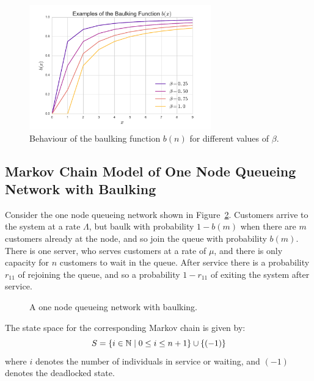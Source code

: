\documentclass{article}
\begin{document}
\begin{figure}[!hbtp]
    \begin{center}
        \includegraphics[width=0.7\textwidth]{img/examplebaulking.pdf}
    \end{center}
    \caption{Behaviour of the baulking function $b(n)$ for different values of $\beta$.}
    \label{fig:examplebaulkingfunctions}
\end{figure}


\subsection{Markov Chain Model of One Node Queueing Network with Baulking}

Consider the one node queueing network shown in Figure~\ref{fig:onenodenetwork_baulking}.
Customers arrive to the system at a rate $\Lambda$, but baulk with probability $1 - b(m)$ when there are $m$ customers already at the node, and so join the queue with probability $b(m)$.
There is one server, who serves customers at a rate of $\mu$, and there is only capacity for $n$ customers to wait in the queue.
After service there is a probability $r_{11}$ of rejoining the queue, and so a probability $1-r_{11}$ of exiting the system after service.

\begin{figure}[!hbtp]
    \begin{center}
        
    \end{center}
    \caption{A one node queueing network with baulking.}
    \label{fig:onenodenetwork_baulking}
\end{figure}

The state space for the corresponding Markov chain is given by:
        \[S = \{i\in\mathbb{N} \nonscript\; | \nonscript\; 0 \leq i \leq n + 1
        \}\cup\{(-1)\}\]
where \(i\) denotes the number of individuals in service or waiting, and $(-1)$ denotes the deadlocked state.
\end{document}
